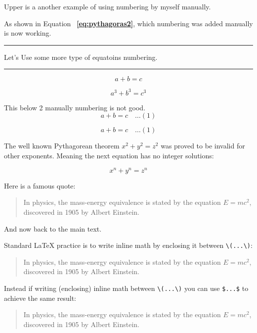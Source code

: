 \documentclass[12pt, letterpaper]{article}
\begin{document}
Upper is a another example of using numbering by myself manually.

As shown in Equation~ \textbf{\ref{eq:pythagoras2}}, which numbering was added manually is now working.



\noindent\rule{\linewidth}{5pt}
\begin{center}
Let's Use some more type of equatoins numbering.
\end{center}
\noindent\rule{\linewidth}{5pt}


\begin{equation}
    a + b = c \tag{000}
\end{equation}


\begin{equation}
    a^3 + b^3 = c^3
    \label{eq:pythagoras3}
\end{equation}


This below 2 manually numbering is not good.
\[
a + b = c \quad \ldots (1)
\]

$$
a + b = c \quad \ldots (1)
$$



\newpage


The well known Pythagorean theorem \(x^2 + y^2 = z^2\) was 
proved to be invalid for other exponents. 
Meaning the next equation has no integer solutions:

\[ x^n + y^n = z^n \]


Here is a famous quote:

\begin{quote}
In physics, the mass-energy equivalence is stated 
by the equation \(E=mc^2\), discovered in 1905 by Albert Einstein.
\end{quote}

And now back to the main text.




\noindent Standard \LaTeX{} practice is to write inline math by enclosing it between \verb|\(...\)|:

\begin{quote}
In physics, the mass-energy equivalence is stated 
by the equation \(E=mc^2\), discovered in 1905 by Albert Einstein.
\end{quote}

\noindent Instead if writing (enclosing) inline math between \verb|\(...\)| you can use \texttt{\$...\$} to achieve the same result:

\begin{quote}
In physics, the mass-energy equivalence is stated 
by the equation $E=mc^2$, discovered in 1905 by Albert Einstein.
\end{quote}
\end{document}
